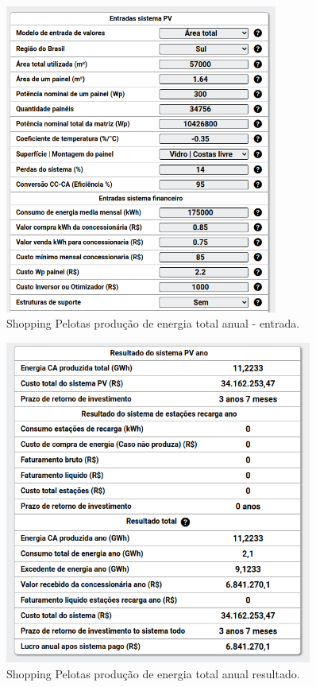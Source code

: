 \begin{figure}[H]
    \centering
    \includegraphics[width=0.8\textwidth]{./Figuras/shopping_3.png}
    \caption{Shopping Pelotas produção de energia total anual - entrada.}
   \label{fig:shopping_3}
\end{figure}

\begin{figure}[H]
    \centering
    \includegraphics[width=0.9\textwidth]{./Figuras/shopping_4.png}
    \caption{Shopping Pelotas produção de energia total anual resultado.}
   \label{fig:shopping_4}
\end{figure}

